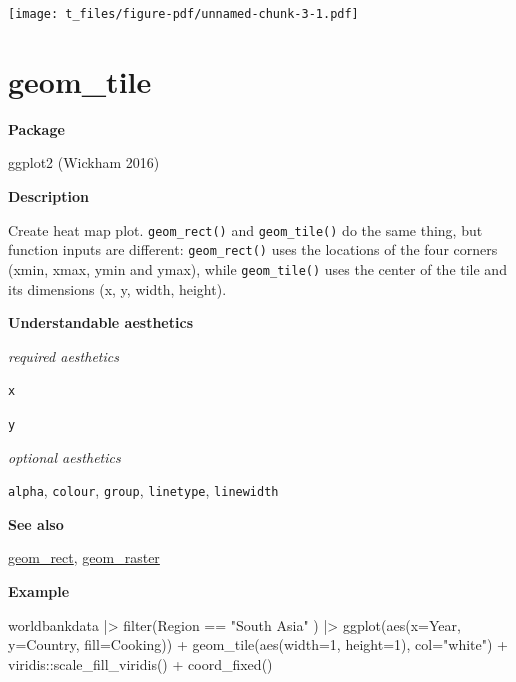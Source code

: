\documentclass[
  letterpaper,
  DIV=11,
  numbers=noendperiod]{scrreprt}
\newenvironment{Shaded}{\begin{snugshade}}{\end{snugshade}}
\newcommand{\AttributeTok}[1]{\textcolor[rgb]{0.40,0.45,0.13}{#1}}
\newcommand{\DecValTok}[1]{\textcolor[rgb]{0.68,0.00,0.00}{#1}}
\newcommand{\FunctionTok}[1]{\textcolor[rgb]{0.28,0.35,0.67}{#1}}
\newcommand{\NormalTok}[1]{\textcolor[rgb]{0.00,0.23,0.31}{#1}}
\newcommand{\SpecialCharTok}[1]{\textcolor[rgb]{0.37,0.37,0.37}{#1}}
\newcommand{\StringTok}[1]{\textcolor[rgb]{0.13,0.47,0.30}{#1}}
\begin{document}
\texttt{[image: t\_files/figure-pdf/unnamed-chunk-3-1.pdf]}

\section{geom\_tile}\label{tile}

\textbf{Package}

ggplot2 (Wickham 2016)

\textbf{Description}

Create heat map plot. \texttt{geom\_rect()} and \texttt{geom\_tile()} do
the same thing, but function inputs are different: \texttt{geom\_rect()}
uses the locations of the four corners (xmin, xmax, ymin and ymax),
while \texttt{geom\_tile()} uses the center of the tile and its
dimensions (x, y, width, height).

\textbf{Understandable aesthetics}

\emph{required aesthetics}

\texttt{x}

\texttt{y}

\emph{optional aesthetics}

\texttt{alpha}, \texttt{colour}, \texttt{group}, \texttt{linetype},
\texttt{linewidth}

\textbf{See also}

\hyperref[rect]{geom\_rect}, \hyperref[raster]{geom\_raster}

\textbf{Example}

\begin{Shaded}
\begin{Highlighting}[]
\NormalTok{ worldbankdata }\SpecialCharTok{|\textgreater{}}
  \FunctionTok{filter}\NormalTok{(Region }\SpecialCharTok{==} \StringTok{"South Asia"}\NormalTok{ ) }\SpecialCharTok{|\textgreater{}}
  \FunctionTok{ggplot}\NormalTok{(}\FunctionTok{aes}\NormalTok{(}\AttributeTok{x=}\NormalTok{Year,}
             \AttributeTok{y=}\NormalTok{Country, }\AttributeTok{fill=}\NormalTok{Cooking)) }\SpecialCharTok{+}
  \FunctionTok{geom\_tile}\NormalTok{(}\FunctionTok{aes}\NormalTok{(}\AttributeTok{width=}\DecValTok{1}\NormalTok{, }\AttributeTok{height=}\DecValTok{1}\NormalTok{), }\AttributeTok{col=}\StringTok{"white"}\NormalTok{) }\SpecialCharTok{+}
\NormalTok{  viridis}\SpecialCharTok{::}\FunctionTok{scale\_fill\_viridis}\NormalTok{() }\SpecialCharTok{+}
  \FunctionTok{coord\_fixed}\NormalTok{()}
\end{Highlighting}
\end{Shaded}
\end{document}

